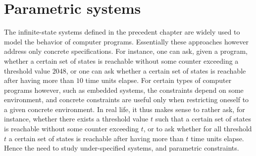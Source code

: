 
 \chapter{Parametric systems}\label{chapter addition of parameters}

The infinite-state systems defined in the precedent chapter are widely used to model the behavior of computer programs. Essentially these approaches however address only concrete specifications.
For instance, one can ask, given a program, whether a certain set of states is reachable without some counter exceeding a threshold value $2048$, or one can ask whether a certain set of states is reachable after having more than $10$ time units elapse.
For certain types of computer programs however, such as embedded systems, the constraints depend on some environment, and concrete constraints are useful only when restricting oneself to a given concrete environment. 
In real life, it thus makes sense to rather ask, for instance, whether there exists a threshold value $t$ such that a certain set of states is reachable without some counter exceeding $t$, or to ask whether for all threshold $t$ a certain set of states is reachable after having more than $t$ time units elapse.
Hence the need to study under-specified systems, 
and parametric constraints. 

